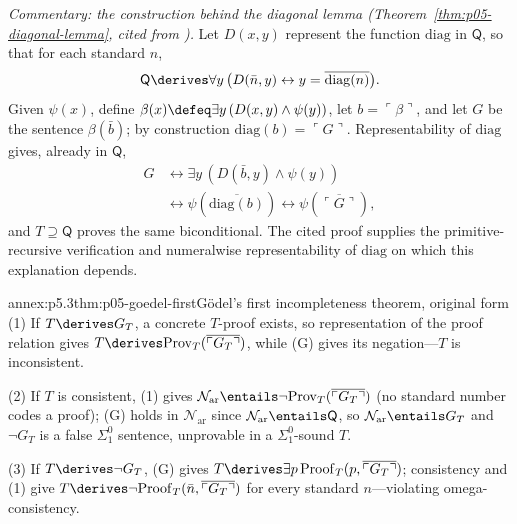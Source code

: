 \label{annex:p5-diagonal-commentary}%
\noindent\emph{Commentary: the construction behind the diagonal lemma
(Theorem~\ref{thm:p05-diagonal-lemma}, cited from
\cite{BoolosBurgessJeffrey2007}).}\enspace
Let \(D(x,y)\) represent the function \(\mathrm{diag}\) in \(\mathsf Q\),
so that for each standard \(n\),
\[
  \mathsf Q\derives\forall y\,
  \bigl(D(\bar n,y)\leftrightarrow
  y=\overline{\mathrm{diag}(n)}\bigr).
\]
Given \(\psi(x)\), define
\(\beta(x)\defeq\exists y\,(D(x,y)\land\psi(y))\), let
\(b=\ulcorner\beta\urcorner\), and let \(G\) be the sentence
\(\beta(\bar b)\); by construction
\(\mathrm{diag}(b)=\ulcorner G\urcorner\).  Representability of
\(\mathrm{diag}\) gives, already in \(\mathsf Q\),
\[
\begin{aligned}
  G&\leftrightarrow\exists y\,(D(\bar b,y)\land\psi(y))\\
   &\leftrightarrow\psi(\overline{\mathrm{diag}(b)})
    \leftrightarrow\psi(\overline{\ulcorner G\urcorner}),
\end{aligned}
\]
and \(T\supseteq\mathsf Q\) proves the same biconditional.  The cited
proof supplies the primitive-recursive verification and numeralwise
representability of \(\mathrm{diag}\) on which this explanation depends.

\begin{annexitem}{annex:p5.3}{thm:p05-goedel-first}{G\"odel's first incompleteness theorem, original form}
(1) If \(T\derives G_T\), a concrete \(T\)-proof exists, so
representation of the proof relation gives
\(T\derives\mathrm{Prov}_T(\overline{\ulcorner G_T\urcorner})\), while
(G) gives its negation---\(T\) is inconsistent.

(2) If \(T\) is consistent, (1) gives
\(\mathcal N_{\mathrm{ar}}\entails\neg\mathrm{Prov}_T(\overline{\ulcorner
G_T\urcorner})\) (no standard number codes a proof); (G) holds in
\(\mathcal N_{\mathrm{ar}}\) since \(\mathcal N_{\mathrm{ar}}\entails\mathsf Q\), so
\(\mathcal N_{\mathrm{ar}}\entails G_T\) and \(\neg G_T\) is a false \(\Sigma^0_1\)
sentence, unprovable in a \(\Sigma^0_1\)-sound \(T\).

(3) If \(T\derives\neg G_T\), (G) gives
\(T\derives\exists p\,\mathrm{Proof}_T(p,\overline{\ulcorner
G_T\urcorner})\); consistency and (1) give
\(T\derives\neg\mathrm{Proof}_T(\bar n,\overline{\ulcorner
G_T\urcorner})\) for every standard \(n\)---violating omega-consistency.
\end{annexitem}

